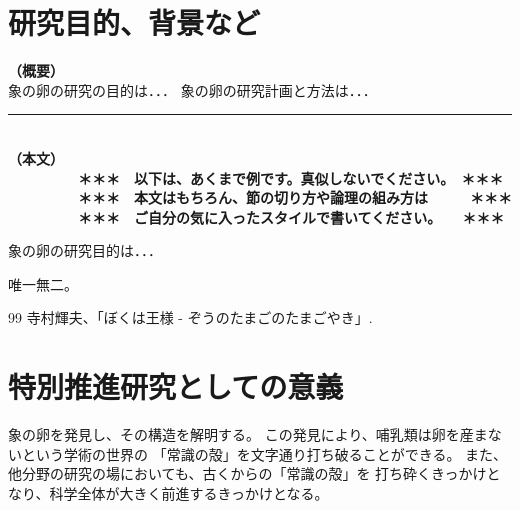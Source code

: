 \documentclass[11pt,a4j,dvipdfmx]{jarticle} 					%
\newcommand{\研究課題名}{象の卵}
\newcommand{\研究機関名}{逢坂大学}
\newcommand{\研究代表者氏名}{湯川秀樹}
\newcommand{\研究期間の最終元号年度}{11}  %
\begin{document}

\section{研究目的、背景など}

\JSPSInstructions		%
\noindent
\mbox{\textbf{（概要）}}\\
	象の卵の研究の目的は．．．	
	象の卵の研究計画と方法は．．．

\noindent
\rule{\linewidth}{1pt}\\
\noindent
\mbox{\textbf{（本文）}}
\textbf{\\　　　　　＊＊＊　以下は、あくまで例です。真似しないでください。　＊＊＊\\
　　　　　＊＊＊　本文はもちろん、節の切り方や論理の組み方は　　　＊＊＊\\
　　　　　＊＊＊　ご自分の気に入ったスタイルで書いてください。　　＊＊＊}

	 象の卵の研究目的は．．．

	唯一無二。




	\vspace{1cm}
	\begin{thebibliography}{99}
		 寺村輝夫、「ぼくは王様 - ぞうのたまごのたまごやき」.
	\end{thebibliography}




\section{特別推進研究としての意義}

	象の卵を発見し、その構造を解明する。
	この発見により、哺乳類は卵を産まないという学術の世界の
	「常識の殻」を文字通り打ち破ることができる。
	また、他分野の研究の場においても、古くからの「常識の殻」を
	打ち砕くきっかけとなり、科学全体が大きく前進するきっかけとなる。
\end{document}
